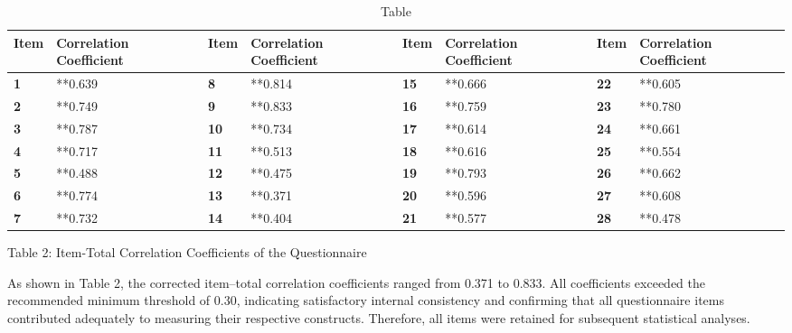 \documentclass[10pt]{NSP1}
\begin{document}
\begin{table}[tbp]
\centering
{\small
\begin{tabular}{|p{}|p{}|p{}|p{}|p{}|p{}|p{}|p{}|}
\hline
\cellcolor[HTML]{DDD9C3}\textbf{Item} & \cellcolor[HTML]{DDD9C3}\textbf{Correlation Coefficient} & \cellcolor[HTML]{DDD9C3}\textbf{Item} & \cellcolor[HTML]{DDD9C3}\textbf{Correlation Coefficient} & \cellcolor[HTML]{DDD9C3}\textbf{Item} & \cellcolor[HTML]{DDD9C3}\textbf{Correlation Coefficient} & \cellcolor[HTML]{DDD9C3}\textbf{Item} & \cellcolor[HTML]{DDD9C3}\textbf{Correlation Coefficient} \\
\hline
\cellcolor[HTML]{DDD9C3}\textbf{1} & **0.639 & \textbf{8} & **0.814 & \textbf{15} & **0.666 & \textbf{22} & **0.605 \\
\hline
\cellcolor[HTML]{DDD9C3}\textbf{2} & **0.749 & \textbf{9} & **0.833 & \textbf{16} & **0.759 & \textbf{23} & **0.780 \\
\hline
\cellcolor[HTML]{DDD9C3}\textbf{3} & **0.787 & \textbf{10} & **0.734 & \textbf{17} & **0.614 & \textbf{24} & **0.661 \\
\hline
\cellcolor[HTML]{DDD9C3}\textbf{4} & **0.717 & \textbf{11} & **0.513 & \textbf{18} & **0.616 & \textbf{25} & **0.554 \\
\hline
\cellcolor[HTML]{DDD9C3}\textbf{5} & **0.488 & \textbf{12} & **0.475 & \textbf{19} & **0.793 & \textbf{26} & **0.662 \\
\hline
\cellcolor[HTML]{DDD9C3}\textbf{6} & **0.774 & \textbf{13} & **0.371 & \textbf{20} & **0.596 & \textbf{27} & **0.608 \\
\hline
\cellcolor[HTML]{DDD9C3}\textbf{7} & **0.732 & \textbf{14} & **0.404 & \textbf{21} & **0.577 & \textbf{28} & **0.478 \\
\hline
\end{tabular}}
\caption{Table}

\end{table}

Table 2: Item-Total Correlation Coefficients of the Questionnaire

As shown in Table 2, the corrected item–total correlation coefficients ranged from 0.371 to 0.833. All coefficients exceeded the recommended minimum threshold of 0.30, indicating satisfactory internal consistency and confirming that all questionnaire items contributed adequately to measuring their respective constructs. Therefore, all items were retained for subsequent statistical analyses.
\end{document}
